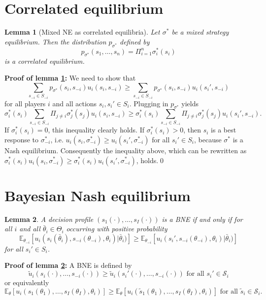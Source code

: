 \documentclass[a4paper,11pt]{article}
\newtheorem{lemma}{Lemma}
\begin{document}
\section{Correlated equilibrium}
\label{sec:corr-equil}

\begin{lemma}[Mixed NE as correlated equilibria]\label{lem:mneCorrEq}
Let \(\sigma^*\) be a mixed strategy equilibrium. Then the distribution \(p_{\sigma^*}\) defined by
\begin{equation*}
  p_{\sigma^*}(s_1,\dots,s_n)=\Pi_{i=1}^n\sigma_i^*(s_i)
\end{equation*}
is a correlated equilibrium.
\end{lemma}
\textbf{Proof of lemma \ref{lem:mneCorrEq}: }We need to show that
  \begin{equation*}
    \sum_{s_{-i}\in S_{-i}}p_{\sigma^*}(s_i,s_{-i})u_i(s_i,s_{-i})\geq \sum_{s_{-i}\in S_{-i}}p_{\sigma^*}(s_i,s_{-i})u_i(s_i',s_{-i})
  \end{equation*}
  for all players $i$ and all actions $s_i,s_i'\in S_i$. Plugging in $p_{\sigma^*}$ yields
   \begin{equation*}
    \sigma_i^*(s_i) \sum_{s_{-i}\in S_{-i}}\Pi_{j\neq i}\sigma_j^*(s_j) u_i(s_i,s_{-i})\geq \sigma_i^*(s_i)\sum_{s_{-i}\in S_{-i}}\Pi_{j\neq i}\sigma_j^*(s_j)u_i(s_i',s_{-i}).
  \end{equation*}
If $\sigma_i^*(s_i)=0$, this inequality clearly holds. If $\sigma_i^*(s_i)>0$, then $s_i$ is a best response to $\sigma_{-i}^*$, i.e. $u_i(s_i,\sigma_{-i}^*)\geq u_i(s_i',\sigma_{-i}^*)$ for all $s_i'\in S_i$, because $\sigma^*$ is a Nash equilibrium. Consequently the inequality above, which can be rewritten as $\sigma_i^*(s_i) u_i(s_i,\sigma_{-i}^*)\geq \sigma_i^*(s_i) u_i(s_i',\sigma_{-i}^*)$, holds.\qed 

\section{Bayesian Nash equilibrium}
\label{sec:bayes-nash-equil}

\begin{lemma}\label{lem:BNEexp}
A decision profile \((s_1(\cdot),\dots,s_I(\cdot))\) is a BNE if and only if for all \(i\) and all \(\bar \theta_i\in\Theta_i\) occurring with positive probability
$$\mathbb{E}_{\theta_{-i}}[u_i(s_i(\bar\theta_i),s_{-i}(\theta_{-i}),\theta_i)|\bar\theta_i)]\geq \mathbb{E}_{\theta_{-i}}[u_i(s_i',s_{-i}(\theta_{-i}),\theta_i)|\bar\theta_i)]$$
for all \(s_i'\in S_i\).
\end{lemma}
\textbf{Proof of lemma \ref{lem:BNEexp}: }A BNE is defined by
$$\tilde{u}_i(s_i(\cdot),\dots,s_{-i}(\cdot))\geq \tilde{u}_i (s_i'(\cdot),\dots,s_{-i}(\cdot)) \text{ for all } s_i'\in\mathcal{S}_i $$
or equivalently 
\begin{equation}\label{eq:1}
\mathbb{E}_{\theta}[u_i(s_1(\theta_1),\dots,s_I(\theta_I),\theta_i)] \geq \mathbb{E}_{\theta}[u_i(\tilde s_1(\theta_1),\dots,s_I(\theta_I),\theta_i)] \text{ for all } \tilde s_i\in\mathcal{S}_i.
\end{equation}
\end{document}
